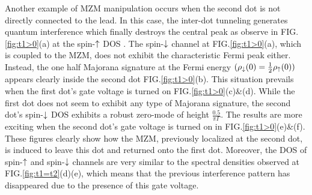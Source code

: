 \documentclass[showpacs,aps,prb,reprint,superscriptaddress]{revtex4-1}
\begin{document}
    Another example of MZM manipulation occurs when the second dot is not directly connected to the lead. In this case, the inter-dot tunneling generates quantum interference which finally destroys the central peak as observe in FIG.\ref{fig:t1>0}(a) at the spin-$\uparrow$ DOS . The spin-$\downarrow$ channel at FIG.\ref{fig:t1>0}(a), which is coupled to the MZM, does not exhibit the characteristic Fermi peak either. Instead, the one half Majorana signature at the Fermi energy $(\rho_\downarrow(0) = \frac{1}{2}\rho_\uparrow(0))$ appears clearly inside the second dot FIG.\ref{fig:t1>0}(b). This situation prevails when the first dot's gate voltage is turned on FIG.\ref{fig:t1>0}(c)\&(d). While the first dot does not seem to exhibit any type of Majorana signature, the second dot's spin-$\downarrow$ DOS exhibits a robust zero-mode of height $\frac{0.5}{\pi \Gamma}$. The results are more exciting when the second dot's gate voltage is turned on in FIG.\ref{fig:t1>0}(e)\&(f). These figures clearly show how the MZM, previously localized at the second dot, is induced to leave this dot and returned onto the first dot. Moreover, the DOS of spin-$\uparrow$ and spin-$\downarrow$ channels are very similar to the spectral densities observed at FIG.\ref{fig:t1=t2}(d)(e), which means that the previous interference pattern has disappeared due to the presence of this gate voltage. 
    
\end{document}
